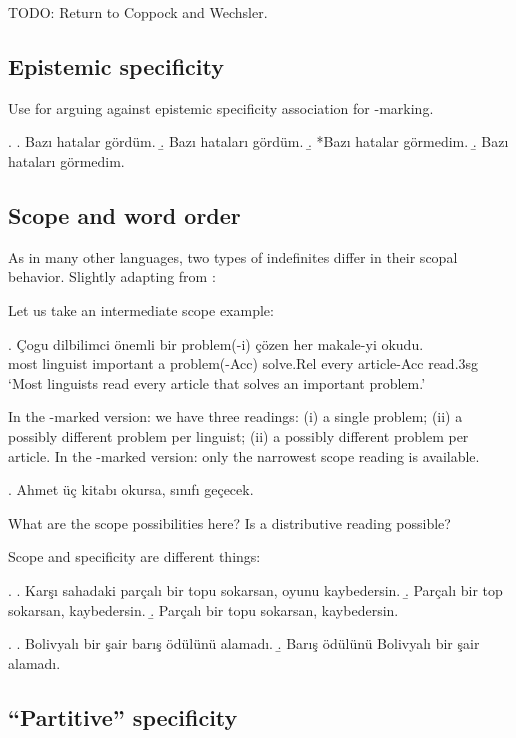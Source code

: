 \documentclass[11pt,a4paper]{article}
\begin{document}
TODO: Return to Coppock and Wechsler.

\subsection{Epistemic specificity}

Use  for arguing against epistemic specificity
association for \acc-marking.


\ex.
\a. Bazı hatalar gördüm.
\b. Bazı hataları gördüm.
\b. *Bazı hatalar görmedim.
\b. Bazı hataları görmedim.


\subsection{Scope and word order}
\label{scscope}

As in many other languages, two types of indefinites differ in their
scopal behavior. Slightly adapting from :

Let us take an intermediate scope example:

\exg. Çogu dilbilimci önemli bir problem(-i) çözen her makale-yi okudu.\\
most linguist important a problem(-Acc) solve.Rel every article-Acc read.3sg\\
`Most linguists read every article that solves an important problem.'

In the \acc-marked version: we have three readings: (i) a single
problem; (ii) a possibly different problem per linguist; (ii) a
possibly different problem per article. In the \zero-marked version:
only the narrowest scope reading is available.


\ex. Ahmet üç kitabı okursa, sınıfı geçecek.

What are the scope possibilities here? Is a distributive reading
possible?



Scope and specificity are different things:

\ex.
\a. Karşı sahadaki parçalı bir topu sokarsan, oyunu kaybedersin.
\b. Parçalı bir top sokarsan, kaybedersin.
\b. Parçalı bir topu sokarsan, kaybedersin.


\ex.
\a. Bolivyalı bir şair barış ödülünü alamadı.
\b. Barış ödülünü Bolivyalı bir şair alamadı. 

\subsection{``Partitive'' specificity} %
\label{scpartspec}
\end{document}
